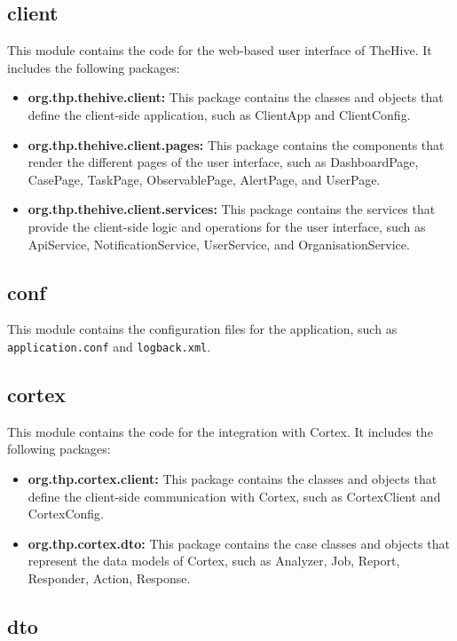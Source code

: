\documentclass{article}
\begin{document}
\subsection{client}

This module contains the code for the web-based user interface of TheHive. It includes the following packages:

\begin{itemize}
    \item \textbf{org.thp.thehive.client:} This package contains the classes and objects that define the client-side application, such as ClientApp and ClientConfig.
    \item \textbf{org.thp.thehive.client.pages:} This package contains the components that render the different pages of the user interface, such as DashboardPage, CasePage, TaskPage, ObservablePage, AlertPage, and UserPage.
    \item \textbf{org.thp.thehive.client.services:} This package contains the services that provide the client-side logic and operations for the user interface, such as ApiService, NotificationService, UserService, and OrganisationService.
\end{itemize}
\subsection{conf}

This module contains the configuration files for the application, such as \texttt{application.conf} and \texttt{logback.xml}.

\subsection{cortex}

This module contains the code for the integration with Cortex. It includes the following packages:

\begin{itemize}
    \item \textbf{org.thp.cortex.client:} This package contains the classes and objects that define the client-side communication with Cortex, such as CortexClient and CortexConfig.
    \item \textbf{org.thp.cortex.dto:} This package contains the case classes and objects that represent the data models of Cortex, such as Analyzer, Job, Report, Responder, Action, Response.
\end{itemize}

\subsection{dto}
\end{document}

